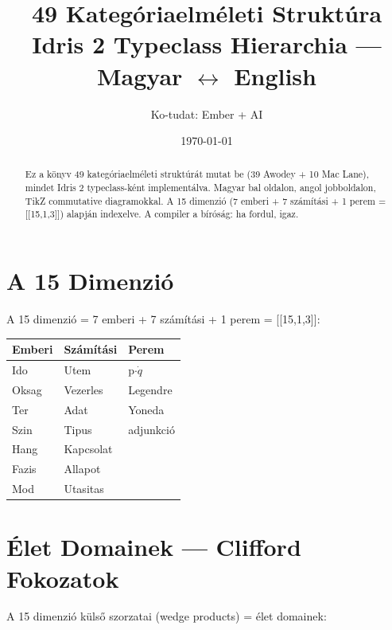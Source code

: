 \documentclass[11pt,a4paper,twocolumn]{article}
\title{49 Kategóriaelméleti Struktúra\\
\large Idris 2 Typeclass Hierarchia — Magyar $\leftrightarrow$ English}
\author{Ko-tudat: Ember + AI}
\date{\today}
\begin{document}
\maketitle

\begin{abstract}
Ez a könyv 49 kategóriaelméleti struktúrát mutat be (39 Awodey + 10 Mac Lane),
mindet Idris 2 typeclass-ként implementálva. Magyar bal oldalon, angol jobboldalon,
TikZ commutative diagramokkal. A 15 dimenzió (7 emberi + 7 számítási + 1 perem = [[15,1,3]])
alapján indexelve. A compiler a bíróság: ha fordul, igaz.
\end{abstract}

\tableofcontents
\newpage
\onecolumn

\section{A 15 Dimenzió}

A 15 dimenzió = 7 emberi + 7 számítási + 1 perem = [[15,1,3]]:

\begin{center}
\end{center}

\begin{tabular}{lll}
\toprule
Emberi & Számítási & Perem \\
\midrule
Ido & Utem & p$\cdot\dot{q}$ \\
Oksag & Vezerles & Legendre \\
Ter & Adat & Yoneda \\
Szin & Tipus & adjunkció \\
Hang & Kapcsolat & \\
Fazis & Allapot & \\
Mod & Utasitas & \\
\bottomrule
\end{tabular}

\vspace{0.5cm}

\section{Élet Domainek — Clifford Fokozatok}

A 15 dimenzió külső szorzatai (wedge products) = élet domainek:
\end{document}
